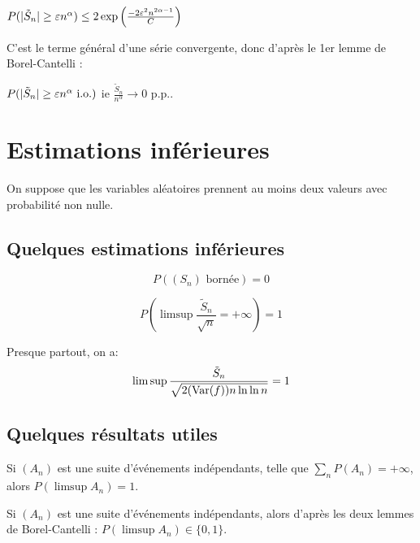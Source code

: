 \documentclass[10pt,a4paper,notitlepage ]{report}
\begin{document}
\begin{demo}
	$P(|\tilde S_n| \ge \varepsilon n^\alpha) \le 2\exp \left( \frac{-2\varepsilon^2n^{2\alpha -1}}{C} \right)$
	
	C'est le terme général d'une série convergente, donc d'après le 1er lemme de Borel-Cantelli :
	
	$P(|\tilde S_n| \ge \varepsilon n^\alpha \text{ i.o.})$ ie $\frac{\tilde S_n}{n^\alpha} \rightarrow 0 \text{ p.p.}$.
\end{demo}

\section{Estimations inférieures}

On suppose que les variables aléatoires prennent au moins deux valeurs avec probabilité non nulle.

\subsection{Quelques estimations inférieures}

\begin{theorem}
	\[ P((S_n) \text{ bornée} ) = 0\]
\end{theorem}

\begin{theorem}
	\[ P(\limsup \frac{\tilde S_n}{\sqrt n} = +\infty ) = 1 \]
\end{theorem}

\begin{theorem}
	Presque partout, on a:
	\[ \limsup \frac{\tilde S_n}{\sqrt{2(\mathrm{Var}(f))n \ln \ln n}} = 1\]
\end{theorem}

\subsection{Quelques résultats utiles}

\begin{lemme}
	Si $(A_n)$ est une suite d'événements indépendants, telle que $\underset n \sum P(A_n) = + \infty$, alors $P(\limsup A_n) = 1$.
\end{lemme}

\begin{rem}
	Si $(A_n)$ est une suite d'événements indépendants, alors d'après les deux lemmes de Borel-Cantelli : $P(\limsup A_n) \in \{0,1\}$.
\end{rem}
\end{document}
